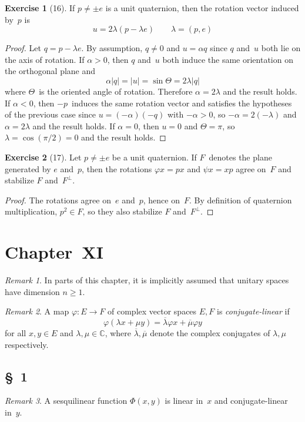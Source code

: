 \documentclass[letterpaper,12pt]{article}
\newcommand{\C}{\mathbb{C}}
\newcommand{\oc}[1]{#1^{\perp}}
\newcommand{\iprod}[2]{(#1,#2)}
\newcommand{\norm}[1]{|#1|}
\newcommand{\conj}[1]{\overline{#1}}
\theoremstyle{definition}
\newtheorem*{exer}{Exercise}
\theoremstyle{remark}
\newtheorem*{rmk}{Remark}
\begin{document}
\begin{exer}[16]
If \(p\ne\pm e\) is a unit quaternion, then the rotation vector induced by~\(p\) is
\[u=2\lambda(p-\lambda e)\qquad\lambda=\iprod{p}{e}\]
\end{exer}
\begin{proof}
Let \(q=p-\lambda e\). By assumption, \(q\ne 0\) and \(u=\alpha q\) since \(q\) and~\(u\) both lie on the axis of rotation. If \(\alpha>0\), then \(q\) and~\(u\) both induce the same orientation on the orthogonal plane and
\[\alpha\norm{q}=\norm{u}=\sin\Theta=2\lambda\norm{q}\]
where \(\Theta\)~is the oriented angle of rotation. Therefore \(\alpha=2\lambda\) and the result holds. If \(\alpha<0\), then \(-p\)~induces the same rotation vector and satisfies the hypotheses of the previous case since \(u=(-\alpha)(-q)\) with \(-\alpha>0\), so \(-\alpha=2(-\lambda)\) and \(\alpha=2\lambda\) and the result holds. If \(\alpha=0\), then \(u=0\) and \(\Theta=\pi\), so \(\lambda=\cos(\pi/2)=0\) and the result holds.
\end{proof}

\begin{exer}[17]
Let \(p\ne\pm e\) be a unit quaternion. If \(F\)~denotes the plane generated by \(e\) and~\(p\), then the rotations \(\varphi x=px\) and \(\psi x=xp\) agree on~\(F\) and stabilize \(F\) and~\(\oc{F}\).
\end{exer}
\begin{proof}
The rotations agree on~\(e\) and~\(p\), hence on~\(F\). By definition of quaternion multiplication, \(p^2\in F\), so they also stabilize \(F\) and~\(\oc{F}\).
\end{proof}

\section*{Chapter~XI}
\begin{rmk}
In parts of this chapter, it is implicitly assumed that unitary spaces have dimension \(n\ge 1\).
\end{rmk}

\begin{rmk}
A map \(\varphi:E\to F\) of complex vector spaces \(E,F\) is \emph{conjugate-linear} if
\[\varphi(\lambda x+\mu y)=\conj{\lambda}\varphi x+\conj{\mu}\varphi y\]
for all \(x,y\in E\) and \(\lambda,\mu\in\C\), where \(\conj{\lambda},\conj{\mu}\) denote the complex conjugates of \(\lambda,\mu\) respectively.
\end{rmk}

\subsection*{\S~1}
\begin{rmk}
A sesquilinear function \(\Phi(x,y)\) is linear in~\(x\) and conjugate-linear in~\(y\).
\end{rmk}
\end{document}
